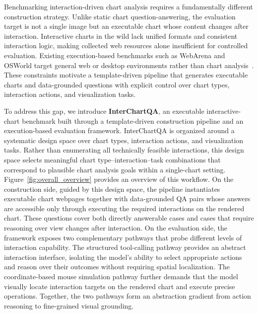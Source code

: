 \documentclass[review,journal,hideappendix]{vgtc} %
\newcommand{\dataset}{InterChartQA}
\newcommand{\placeholder}[1]{\textcolor{red}{\textbf{[Placeholder: #1]}}}
\begin{document}
Benchmarking interaction-driven chart analysis requires a fundamentally different construction strategy. Unlike static chart question-answering, the evaluation target is not a single image but an executable chart whose content changes after interaction. Interactive charts in the wild lack unified formats and consistent interaction logic, making collected web resources alone insufficient for controlled evaluation. 
Existing execution-based benchmarks such as WebArena and OSWorld target general web or desktop environments rather than chart analysis~\cite{zhouWebArenaRealisticWeb2023,xieOSWorldBenchmarkingMultimodal2024}.
These constraints motivate a template-driven pipeline that generates executable charts and data-grounded questions with explicit control over chart types, interaction actions, and visualization tasks.

To address this gap, we introduce \textbf{\dataset{}}, an executable interactive-chart benchmark built through a template-driven construction pipeline and an execution-based evaluation framework. \dataset{} is organized around a systematic design space over chart types, interaction actions, and visualization tasks. 
Rather than enumerating all technically feasible interactions, this design space selects meaningful chart type--interaction--task combinations that correspond to plausible chart analysis goals within a single-chart setting.
Figure~\ref{fig:overall_overview} provides an overview of this workflow. On the construction side, guided by this design space, the pipeline instantiates executable chart webpages together with data-grounded QA pairs whose answers are accessible only through executing the required interactions on the rendered chart. These questions cover both directly answerable cases and cases that require reasoning over view changes after interaction. On the evaluation side, the framework exposes two complementary pathways that probe different levels of interaction capability. The structured tool-calling pathway provides an abstract interaction interface, isolating the model's ability to select appropriate actions and reason over their outcomes without requiring spatial localization. The coordinate-based mouse simulation pathway further demands that the model visually locate interaction targets on the rendered chart and execute precise operations. Together, the two pathways form an abstraction gradient from action reasoning to fine-grained visual grounding. 
\end{document}
